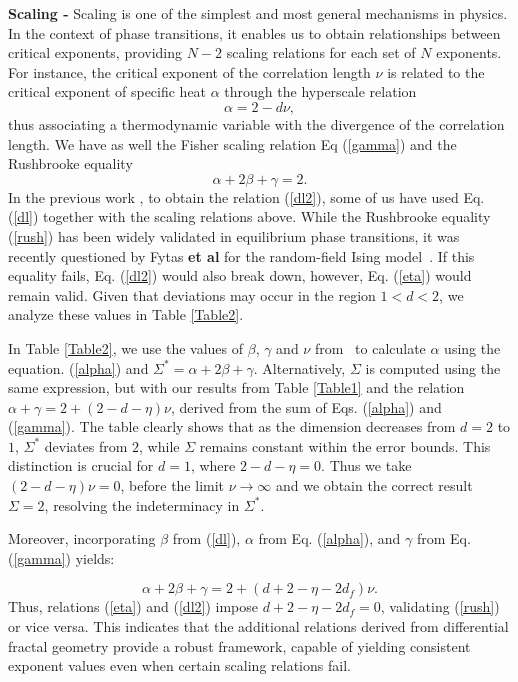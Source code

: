 \documentclass[pre,aps,twocolumn,showpacs,floatfix,nofootinbib,superscriptaddress,linenumbers]{revtex4-1}
\begin{document}
{\bf Scaling - } Scaling is one of the simplest and most general mechanisms in physics. In the context of phase transitions, it enables us to obtain relationships between critical exponents, providing $N-2$ scaling relations for each set of $N$ exponents. For instance, the critical exponent of the correlation length $\nu$ is related to the critical exponent of specific heat $\alpha$ through the hyperscale relation~\cite{Cardy96}
\begin{equation}
\label{alpha}
\alpha=2-d\nu,
\end{equation}
thus associating a thermodynamic variable with the divergence of the correlation length.  We have as well the Fisher scaling relation Eq (\ref{gamma})
 and the Rushbrooke equality~\cite{Cardy96}
\begin{equation}
\label{rush}
\alpha +2\beta +\gamma=2.
\end{equation}
In the previous work \cite{Lima24}, to obtain the relation (\ref{dl2}), some of us have used Eq. (\ref{dl}) together with the scaling relations above. While the Rushbrooke equality (\ref{rush}) has been widely validated in equilibrium phase transitions, it was recently questioned by Fytas {\bf et al} for the random-field Ising model~\cite{Fytas16}. If this equality fails, Eq. (\ref{dl2}) would also break down, however,  Eq. (\ref{eta}) would remain valid. {Given that} {deviations may} occur in the region $1<d<2$, we analyze these values in Table \ref{Table2}.

In Table \ref{Table2}, we use the values of $\beta$, $\gamma$ and $\nu$ from~\cite{f.y.wu} to calculate $\alpha$ using the equation. (\ref{alpha}) and $\Sigma^*= \alpha +2\beta+\gamma$. Alternatively, $\Sigma$ is computed using the same expression, but with our results from Table \ref{Table1} and the relation $\alpha+\gamma=2+(2-d-\eta)\nu$, derived from the sum of Eqs. (\ref{alpha}) and (\ref{gamma}).  The table clearly shows that as the dimension decreases from $d=2$ to $1$, $\Sigma^*$ deviates from $2$, while $\Sigma$ remains constant within the error bounds.  This distinction is crucial for $d=1$, where $2-d-\eta=0$.   Thus we take $(2-d-\eta)\nu=0$, before  the  limit $\nu \rightarrow \infty$ and we obtain the correct result $\Sigma=2$, resolving the indeterminacy  in $\Sigma^*$.

Moreover, incorporating $\beta$ from (\ref{dl}), $\alpha$ from Eq. (\ref{alpha}), and $\gamma$ from Eq. (\ref{gamma}) yields:
 
\begin{equation}
\label{Trush}
\alpha +2\beta +\gamma=2+(d+2-\eta-2d_f)\nu.
\end{equation}
Thus, relations (\ref{eta}) and (\ref{dl2}) impose $d+2-\eta-2d_f=0$,  validating (\ref{rush}) or vice versa. This indicates that the additional relations derived from differential fractal geometry provide a robust framework, capable of yielding consistent exponent values even when certain scaling relations fail.
\end{document}
